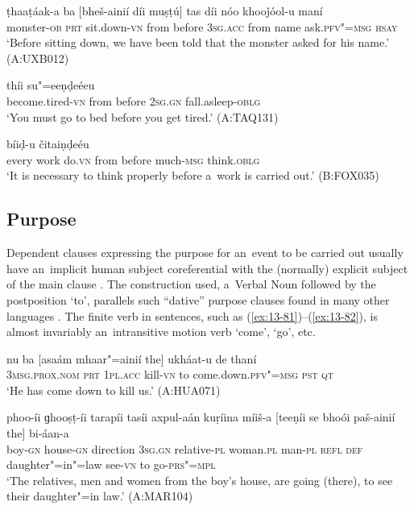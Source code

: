 \begin{exe}
\ex
\label{ex:13-78}
\gll ṭhaaṭáak-a ba [bheš-ainií díi muṣṭú] tas díi nóo khooǰóol-u maní \\
monster-\textsc{ob} \textsc{prt} sit.down-\textsc{vn} from before \textsc{3sg.acc} from name ask.\textsc{pfv"=msg} \textsc{hsay} \\
\glt `Before sitting down, we have been told that the monster asked for his name.' (A:UXB012)

\ex
\label{ex:13-79}
 thíi su"=eeṇḍeéeu  \\
become.tired-\textsc{vn} from before \textsc{2sg.gn} fall.asleep-\textsc{oblg} \\
\glt `You must go to bed before you get tired.' (A:TAQ131)

\ex
\label{ex:13-80}
 bíiḍ-u čitaiṇḍeéu  \\
every work do.\textsc{vn} from before much-\textsc{msg} think.\textsc{oblg} \\
\glt `It is necessary to think properly before a~work is carried out.' (B:FOX035)
\end{exe}

\subsection{Purpose}
\label{subsec:13-4-2}

Dependent clauses expressing the purpose for an~event to be carried out usually have an~implicit human subject coreferential with the (normally) explicit subject of the main clause \citep[337]{givon2001b}. The construction used, a~Verbal Noun followed by the postposition `to', parallels such ``dative'' purpose clauses found in many other languages \citep[251--252]{thompsonetal2007}. The finite verb in sentences, such as (\ref{ex:13-81})--(\ref{ex:13-82}), is almost invariably an~intransitive motion verb `come', `go', etc.

\begin{exe}
\ex
\label{ex:13-81}
\gll nu ba [asaám mhaar"=ainií the] ukháat-u de thaní \\
\textsc{3msg.prox.nom} \textsc{prt} \textsc{1pl.acc} kill-\textsc{vn} to come.down.\textsc{pfv"=msg} \textsc{pst} \textsc{qt}  \\
\glt `He has come down to kill us.' (A:HUA071)

\ex
\label{ex:13-82}
\gll phoo-íi ɡhooṣṭ-íi tarapíi tasíi axpul-aán kuṛíina míiš-a [teeṇíi se bhoói paš-ainií the] bi-áan-a \\
boy-\textsc{gn} house-\textsc{gn} direction \textsc{3sg.gn} relative-\textsc{pl} woman.\textsc{pl}  man-\textsc{pl} \textsc{refl} \textsc{def} daughter"=in"=law see-\textsc{vn} to go-\textsc{prs"=mpl} \\
\glt `The relatives, men and women from the boy's house, are going (there), to see their daughter"=in law.' (A:MAR104) 
\end{exe}

